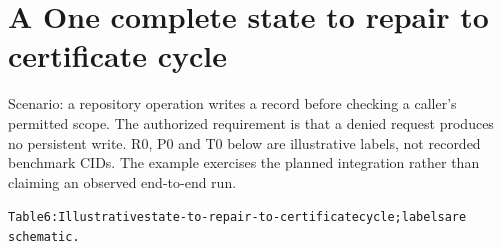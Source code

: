\clearpage
\clearpage
\section*{A One complete state to repair to certificate cycle}
Scenario: a repository operation writes a record before checking a caller’s permitted scope. The
authorized requirement is that a denied request produces no persistent write. R0, P0 and T0 below
are illustrative labels, not recorded benchmark CIDs. The example exercises the planned integration
rather than claiming an observed end-to-end run.

\begingroup\fontsize{7}{8.4}\selectfont
\begin{alltt}
Table 6: Illustrative state-to-repair-to-certificate cycle; labels are
schematic.
\end{alltt}\endgroup

